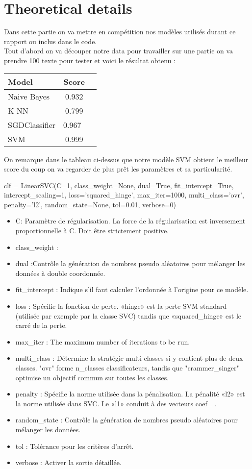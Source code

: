 \documentclass[english,a4paper,11pt,oneside]{article}
\begin{document}
	\section{Theoretical details}{
		Dans cette partie on va mettre en compétition nos modèles utilisés durant ce rapport ou inclus dans le code.\\
		Tout d'abord on va découper notre data pour travailler sur une partie on va prendre 100 texte pour tester et voici le résultat obtenu :\\
		\begin{tabular}{ |l|c| r|}
			\hline
			Model &  Score \\ \hline
			Naive Bayes & 0.932 \\ \hline
			K-NN & 0.799 \\ \hline
			SGDClassifier & 0.967 \\ \hline
			SVM 		&  0.999 \\ \hline
		\end{tabular}
		
		On remarque dans le tableau ci-dessus que notre modèle SVM obtient le meilleur score du coup on va regarder de plus prêt les paramètres et sa particularité.\\
		\newpage
		\begin{pythonn}
			clf = LinearSVC(C=1,
			  class_weight=None,
			  dual=True,
			  fit_intercept=True,
			  intercept_scaling=1,
			  loss='squared_hinge',
			  max_iter=1000,
			  multi_class='ovr',
			  penalty='l2',
			  random_state=None,
			  tol=0.01,
			  verbose=0)
		\end{pythonn}
		\begin{itemize}
			\item C: Paramètre de régularisation. La force de la régularisation est inversement proportionnelle à C. Doit être strictement positive.
			\item class\_weight :
			\item dual :Contrôle la génération de nombres pseudo aléatoires pour mélanger les données à double coordonnée.
			\item fit\_intercept : Indique s'il faut calculer l'ordonnée à l'origine pour ce modèle.
			\item loss : Spécifie la fonction de perte. «hinge» est la perte SVM standard (utilisée par exemple par la classe SVC) tandis que «squared\_hinge» est le carré de la perte.
			\item max\_iter : The maximum number of iterations to be run.
			\item multi\_class : Détermine la stratégie multi-classes si y contient plus de deux classes. "ovr" forme n\_classes classificateurs, tandis que "crammer\_singer" optimise un objectif commun sur toutes les classes.
			\item penalty : Spécifie la norme utilisée dans la pénalisation. La pénalité «l2» est la norme utilisée dans SVC. Le «l1» conduit à des vecteurs coef\_ .
			\item random\_state : Contrôle la génération de nombres pseudo aléatoires pour mélanger les données.
			\item tol : Tolérance pour les critères d'arrêt.
			\item verbose : Activer la sortie détaillée.
			
		\end{itemize}
		
	}



  
\end{document}
